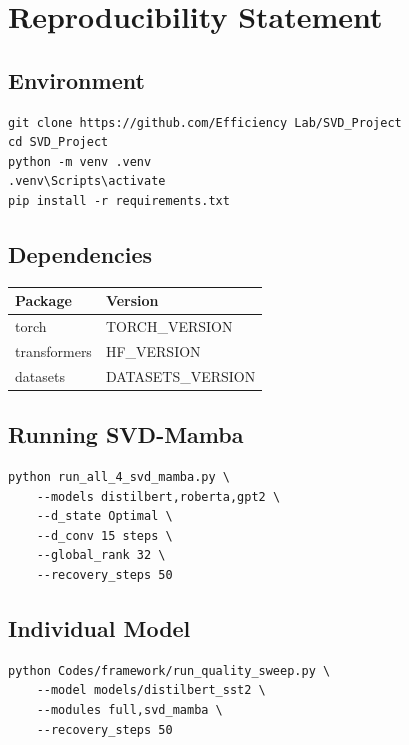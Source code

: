 
\section{Reproducibility Statement}

\subsection{Environment}

\begin{lstlisting}
git clone https://github.com/Efficiency Lab/SVD_Project
cd SVD_Project
python -m venv .venv
.venv\Scripts\activate
pip install -r requirements.txt
\end{lstlisting}

\subsection{Dependencies}

\begin{table}[H]
\centering
\small
\begin{tabular}{ll}
\toprule
\textbf{Package} & \textbf{Version} \\
\midrule
torch & {{TORCH\_VERSION}} \\
transformers & {{HF\_VERSION}} \\
datasets & {{DATASETS\_VERSION}} \\
\bottomrule
\end{tabular}
\end{table}

\subsection{Running SVD-Mamba}

\begin{lstlisting}
python run_all_4_svd_mamba.py \
    --models distilbert,roberta,gpt2 \
    --d_state Optimal \
    --d_conv 15 steps \
    --global_rank 32 \
    --recovery_steps 50
\end{lstlisting}

\subsection{Individual Model}

\begin{lstlisting}
python Codes/framework/run_quality_sweep.py \
    --model models/distilbert_sst2 \
    --modules full,svd_mamba \
    --recovery_steps 50
\end{lstlisting}

